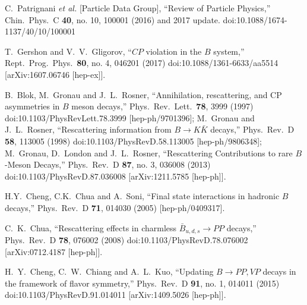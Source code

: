 \documentclass[aps,preprint,floats,epsf,epsfig,nofootinbib,letter]{revtex4}
\begin{document}
\begin{thebibliography}{99}
C.~Patrignani {\it et al.} [Particle Data Group],
  ``Review of Particle Physics,''
  Chin.\ Phys.\ C {\bf 40}, no. 10, 100001 (2016) and 2017 update.
  doi:10.1088/1674-1137/40/10/100001


T.~Gershon and V.~V.~Gligorov,
  ``$CP$ violation in the $B$ system,''
  Rept.\ Prog.\ Phys.\  {\bf 80}, no. 4, 046201 (2017)
  doi:10.1088/1361-6633/aa5514
  [arXiv:1607.06746 [hep-ex]].

B.~Blok, M.~Gronau and J.~L.~Rosner,
  ``Annihilation, rescattering, and CP asymmetries in $B$ meson decays,''
  Phys.\ Rev.\ Lett.\  {\bf 78}, 3999 (1997)
  doi:10.1103/PhysRevLett.78.3999
  [hep-ph/9701396];
M.~Gronau and J.~L.~Rosner,
  ``Rescattering information from $B \to K \bar K$ decays,''
  Phys.\ Rev.\ D {\bf 58}, 113005 (1998)
  doi:10.1103/PhysRevD.58.113005
  [hep-ph/9806348];
M.~Gronau, D.~London and J.~L.~Rosner,
  ``Rescattering Contributions to rare $B$-Meson Decays,''
  Phys.\ Rev.\ D {\bf 87}, no. 3, 036008 (2013)
  doi:10.1103/PhysRevD.87.036008
  [arXiv:1211.5785 [hep-ph]].


  H.Y.~Cheng, C.K.~Chua and A.~Soni,
  ``Final state interactions in hadronic $B$ decays,''
  Phys.\ Rev.\ D {\bf 71}, 014030 (2005)
  [hep-ph/0409317].


  C.~K.~Chua,
  ``Rescattering effects in charmless $\bar B_{u,d,s} \to P P$ decays,''
  Phys.\ Rev.\ D {\bf 78}, 076002 (2008)
  doi:10.1103/PhysRevD.78.076002
  [arXiv:0712.4187 [hep-ph]].

  H.~Y.~Cheng, C.~W.~Chiang and A.~L.~Kuo,
  ``Updating $B\to PP,VP$ decays in the framework of flavor symmetry,''
  Phys.\ Rev.\ D {\bf 91}, no. 1, 014011 (2015)
  doi:10.1103/PhysRevD.91.014011
  [arXiv:1409.5026 [hep-ph]].
  

\end{thebibliography}
\end{document}
